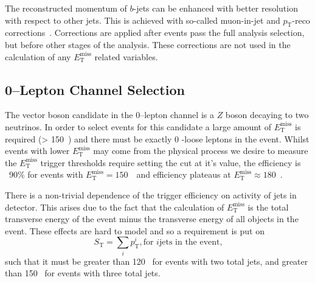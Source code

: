 The reconstructed momentum of $b$-jets can be enhanced with better resolution
with respect to other jets. This is achieved with so-called muon-in-jet and
$p_{\mathrm{T}}$-reco corrections~\cite{VHObjectNote2019}. Corrections are
applied after events pass the full analysis selection, but before other stages
of the analysis. These corrections are not used in the calculation of any
$E_{\mathrm{T}}^{\text{miss}}$ related variables.

\subsection{0--Lepton Channel Selection}
\label{sec:0lep-selection}

The vector boson candidate in the 0--lepton channel is a $Z$ boson decaying to
two neutrinos. In order to select events for this candidate a large amount of
$E_{\mathrm{T}}^{\text{miss}}$ is required (> 150~\GeV) and there must be
exactly 0 \VH-loose leptons in the event. Whilst events with lower
$E_{\mathrm{T}}^{\text{miss}}$ may come from the physical process we desire to
measure the $E_{\mathrm{T}}^{\text{miss}}$ trigger thresholds require setting
the cut at it's value, the efficiency is ~90\% for events with
$E_{\mathrm{T}}^{\text{miss}} = 150$~\GeV\ and efficiency plateaus at
$E_{\mathrm{T}}^{\text{miss}} \approx 180$~\GeV.

There is a non-trivial dependence of the trigger efficiency on activity of
jets in detector. This arises due to the fact that the calculation of
$E_{\mathrm{T}}^{\text{miss}}$ is the total transverse energy of the event minus
the transverse energy of all objects in the event. These effects are hard to
model and so a requirement is put on
\begin{equation} S_{\mathrm{T}} = \sum_i p_{\mathrm{T}}^i, \text{for } i \text{
jets in the event,}
\end{equation} such that it must be greater than 120 \GeV\ for events with two
total jets, and greater than 150 \GeV\ for events with three total jets.

